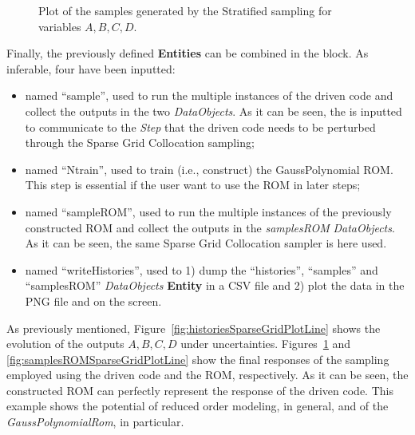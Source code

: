 \begin{enumerate}
\begin{figure}[h!]
  \caption{Plot of the samples generated by the Stratified sampling for variables $A,B,C,D$.}
  \label{fig:samplesSparseGridPlotLine}
 \end{figure}
   Finally, the previously defined \textbf{Entities} can be combined in 
   the  block. As inferable, 
   four  have been inputted:
   \begin{itemize}
     \item {} named ``sample'', used to run the multiple  
     instances of the driven code and 
     collect the outputs in the two \textit{DataObjects}. As it can be
     seen, the  is inputted to communicate to the 
     \textit{Step} that the driven code needs to
     be perturbed through the Sparse Grid Collocation  sampling;
     \item {} named ``Ntrain'', used to train (i.e.,
     construct) the GaussPolynomial ROM. This step is essential if the
     user want to use the ROM in later steps;
     \item {} named ``sampleROM'', used to run the multiple  
     instances of the previously constructed ROM and 
     collect the outputs in the \textit{samplesROM} \textit{DataObjects}.  
     As it can be seen, the same Sparse Grid Collocation sampler is
     here used.
     \item  {} named ``writeHistories'', used to 1) dump 
     the ``histories'', ``samples'' and ``samplesROM'' \textit{DataObjects} 
     \textbf{Entity} in a CSV file and 2) plot the data in the PNG file and 
     on the screen.
   \end{itemize}
\end{enumerate} 
 As previously mentioned, Figure~\ref{fig:historiesSparseGridPlotLine} 
 shows the evolution of the outputs $A,B,C,D$ under uncertainties. 
 Figures~\ref{fig:samplesSparseGridPlotLine} and 
 \ref{fig:samplesROMSparseGridPlotLine} show the final responses 
 of the sampling employed using the driven code and the ROM, 
 respectively. As it can be seen, the constructed ROM can perfectly
 represent the response of the driven code. This example shows the
 potential of reduced order modeling, in general, and of the 
 \textit{GaussPolynomialRom}, in particular.
 
